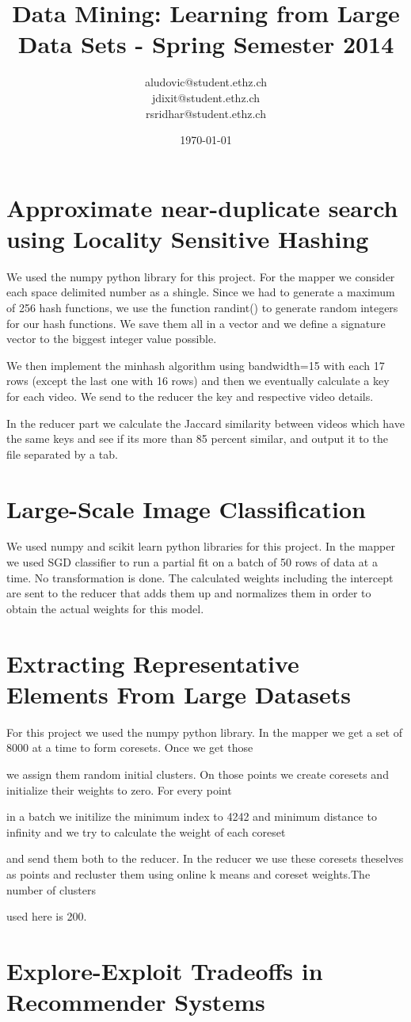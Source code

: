 \documentclass[a4paper, 11pt]{article}
\title{Data Mining: Learning from Large Data Sets - Spring Semester 2014}
\author{aludovic@student.ethz.ch\\ jdixit@student.ethz.ch\\ rsridhar@student.ethz.ch\\}
\date{\today}
\begin{document}
\maketitle

\section{Approximate near-duplicate search using Locality Sensitive Hashing} 

We used the numpy python library for this project. For the mapper we consider each space delimited number as a shingle. Since we had to generate a maximum of 256 hash functions, we use the function randint() to generate random integers for our hash functions. We save them all in a vector and we define a signature vector to the biggest integer value possible.

We then implement the minhash algorithm using bandwidth=15 with each 17 rows (except the last one with 16 rows) and then we eventually calculate a key for each video. We send to the reducer the key and respective video details.

In the reducer part we calculate the Jaccard similarity between videos which have the same keys and see if its more than 85 percent similar, and output it to the file separated by a tab.



\section{Large-Scale Image Classification}

We used numpy and scikit learn python libraries for this project. In the mapper we used SGD classifier to run a partial fit on a batch of 50 rows of data at a time. No transformation is done. The calculated weights including the intercept are sent to the reducer that adds them up and normalizes them in order to obtain the actual weights for this model.

\section{Extracting Representative Elements From Large Datasets}

For this project we used the numpy python library. In the mapper we get a set of 8000 at a time to form coresets. Once we get those

we assign them random initial clusters. On those points we create coresets and initialize their weights to zero. For every point

in a batch we initilize the minimum index to 4242 and minimum distance to infinity and we try to calculate the weight of each coreset

and send them both to the reducer. In the reducer we use these coresets theselves as points and recluster them using online k means and coreset weights.The number of clusters

used here is 200.

\section{Explore-Exploit Tradeoffs in Recommender Systems}
\end{document}
